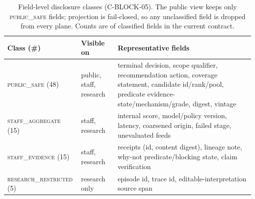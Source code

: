 \begin{table}[t]
\centering
\caption{Field-level disclosure classes (C-BLOCK-05). The public view keeps only \textsc{public\_safe}
fields; projection is fail-closed, so any unclassified field is dropped from every plane. Counts are
of classified fields in the current contract.}
\label{tab:disclosure}
\begin{tabular}{@{}llp{6.4cm}@{}}
\toprule
Class (\#) & Visible on & Representative fields \\
\midrule
\textsc{public\_safe} (48) & public, staff, research & terminal decision, scope qualifier, recommendation action, coverage statement, candidate id/rank/pool, predicate evidence-state/mechanism/grade, digest, vintage \\
\textsc{staff\_aggregate} (15) & staff, research & internal score, model/policy version, latency, coarsened origin, failed stage, unevaluated feeds \\
\textsc{staff\_evidence} (15) & staff, research & receipts (id, content digest), lineage note, why-not predicate/blocking state, claim verification \\
\textsc{research\_restricted} (5) & research only & episode id, trace id, editable-interpretation source span \\
\bottomrule
\end{tabular}
\end{table}

